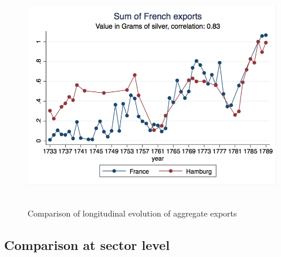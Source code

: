 \documentclass[12pt,a4paper,titlepage,english]{article}
\begin{document}
\begin{figure}
\centering
\caption{Comparison of longitudinal evolution of aggregate exports}
\includegraphics[scale=.3]{long_evolution.png}\\~\\
\end{figure}

\subsection{Comparison at sector level}
\end{document}
